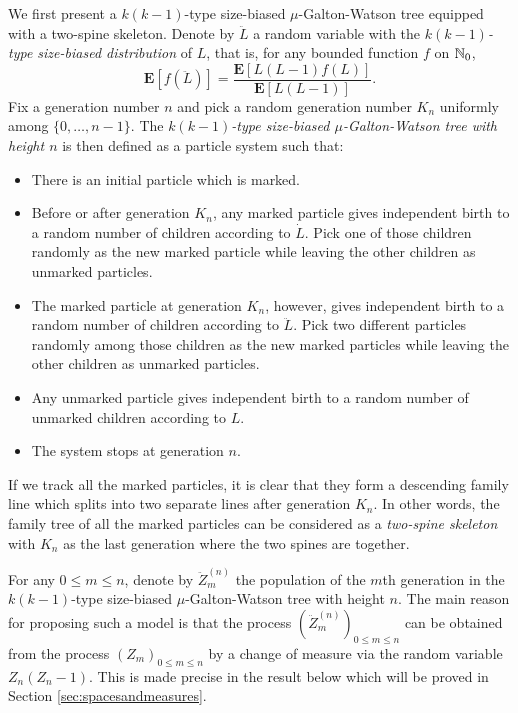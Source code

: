 \documentclass[12pt]{amsart}
\numberwithin{equation}{section}
\newcommand{\defn}[1]{{\em #1}}
\newcommand{\expr}[1]{\left( #1 \right)}
\newcommand{\brac}[1]{\left[ #1 \right]}
\newcommand{\expct}{\mathbf E}
\begin{document}
We first present a $k(k-1)$-type size-biased $\mu$-Galton-Watson tree equipped
with a two-spine skeleton.
	Denote by $\ddot L$ a random variable with the \defn{$k(k-1)$-type size-biased distribution} of $L$, that is, for any
		bounded function $f$ on $\mathbb N_0$,
\begin{equation*}
		\expct\brac{f\expr{\ddot L}}
	=
		\frac{\expct\brac{L(L-1)f(L)}}{\expct\brac{L(L-1)}}.
\end{equation*}
	Fix a generation number $n$ and pick a random generation number $K_n$ uniformly among
		$\{0,\dots,n-1\}$.
	The \defn{$k(k-1)$-type size-biased $\mu$-Galton-Watson tree with height $n$} is then defined as a particle system such that:
\begin{itemize}
\item
	There is an initial particle which is marked.
\item
	Before or after generation $K_n$, any marked particle gives independent birth to a random number of children according to $\dot L$.
	Pick one of those children randomly as the new marked particle while leaving the other children as unmarked particles.
\item
	The marked particle at generation $K_n$, however, gives independent birth to a random number of children according to $\ddot L$.
	Pick two different particles randomly among those children as the new marked particles while leaving the other children as unmarked particles.
\item
	Any unmarked particle gives independent birth to a random number of unmarked children according to $L$.
\item
	The system stops at generation $n$.
\end{itemize}
\par
	If we track all the marked particles, it is clear that they form a descending family line which splits into two separate lines after generation $K_n$.
	In other words, the family tree of all the marked particles can be considered as a \defn{two-spine skeleton} with $K_n$ as the last generation where the two spines are together.
\par	
	For any $0\le m \le n$, denote by $\ddot Z_m^{(n)}$ the population of the
	$m$th generation in the $k(k-1)$-type size-biased $\mu$-Galton-Watson tree with height $n$.
	The main reason for proposing such a model is that the process $(\ddot Z_m^{(n)})_{0\le m\le n}$ can be obtained from the process $(Z_m)_{0\le m\le n}$ by a change of measure via the random variable $Z_n(Z_n-1)$.
	This is made precise in the result below which will be proved in Section \ref{sec:spacesandmeasures}.
\end{document}
